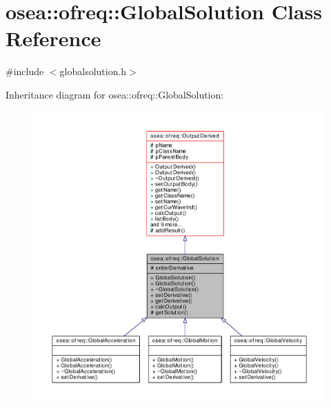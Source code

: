 \hypertarget{classosea_1_1ofreq_1_1_global_solution}{\section{osea\-:\-:ofreq\-:\-:Global\-Solution Class Reference}
\label{classosea_1_1ofreq_1_1_global_solution}
}


{\ttfamily \#include $<$globalsolution.\-h$>$}



Inheritance diagram for osea\-:\-:ofreq\-:\-:Global\-Solution\-:\nopagebreak
\begin{figure}[H]
\begin{center}
\leavevmode
\includegraphics[width=350pt]{classosea_1_1ofreq_1_1_global_solution__inherit__graph}
\end{center}
\end{figure}
